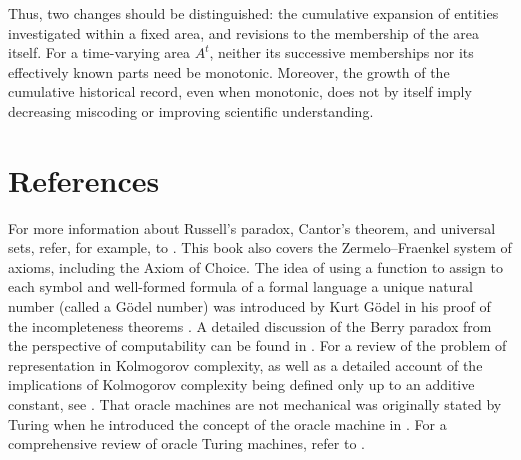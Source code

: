 Thus, two changes should be distinguished: the cumulative expansion of entities investigated within a fixed area, and revisions to the membership of the area itself. For a time-varying area $A^t$, neither its successive memberships nor its effectively known parts need be monotonic. Moreover, the growth of the cumulative historical record, even when monotonic, does not by itself imply decreasing miscoding or improving scientific understanding.

%
%

\section*{References}

For more information about Russell's paradox, Cantor's theorem, and universal sets, refer, for example, to \cite{jech2013set}. This book also covers the Zermelo–Fraenkel system of axioms, including the Axiom of Choice. The idea of using a function to assign to each symbol and well-formed formula of a formal language a unique natural number (called a Gödel number) was introduced by Kurt Gödel in his proof of the incompleteness theorems \cite{godel1931formal}. A detailed discussion of the Berry paradox from the perspective of computability can be found in \cite{chaitin1995berry}. For a review of the problem of representation in Kolmogorov complexity, as well as a detailed account of the implications of Kolmogorov complexity being defined only up to an additive constant, see \cite{li2013introduction}. That oracle machines are not mechanical was originally stated by Turing when he introduced the concept of the oracle machine in \cite{turing1939systems}. For a comprehensive review of oracle Turing machines, refer to \cite{robivc2015foundations}.
